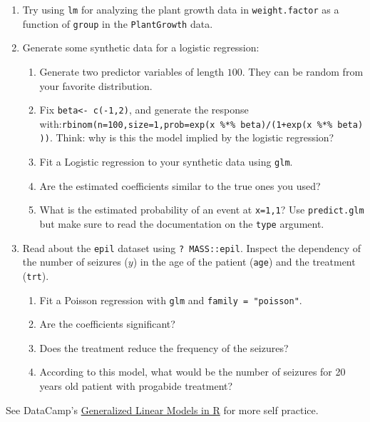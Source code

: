 \documentclass[]{book}
\providecommand{\tightlist}{%
  \setlength{\itemsep}{0pt}\setlength{\parskip}{0pt}}
\theoremstyle{definition}
\theoremstyle{definition}
\theoremstyle{definition}
\theoremstyle{remark}
\begin{document}
\begin{enumerate}
\def\labelenumi{\arabic{enumi}.}
\item
  Try using \texttt{lm} for analyzing the plant growth data in
  \texttt{weight.factor} as a function of \texttt{group} in the
  \texttt{PlantGrowth} data.
\item
  Generate some synthetic data for a logistic regression:

  \begin{enumerate}
  \def\labelenumii{\alph{enumii}.}
  \tightlist
  \item
    Generate two predictor variables of length \(100\). They can be
    random from your favorite distribution.
  \item
    Fix \texttt{beta\textless{}-\ c(-1,2)}, and generate the response
    with:\texttt{rbinom(n=100,size=1,prob=exp(x\ \%*\%\ beta)/(1+exp(x\ \%*\%\ beta)))}.
    Think: why is this the model implied by the logistic regression?
  \item
    Fit a Logistic regression to your synthetic data using \texttt{glm}.
  \item
    Are the estimated coefficients similar to the true ones you used?
  \item
    What is the estimated probability of an event at \texttt{x=1,1}? Use
    \texttt{predict.glm} but make sure to read the documentation on the
    \texttt{type} argument.
  \end{enumerate}
\item
  Read about the \texttt{epil} dataset using \texttt{?\ MASS::epil}.
  Inspect the dependency of the number of seizures (\(y\)) in the age of
  the patient (\texttt{age}) and the treatment (\texttt{trt}).

  \begin{enumerate}
  \def\labelenumii{\arabic{enumii}.}
  \tightlist
  \item
    Fit a Poisson regression with \texttt{glm} and
    \texttt{family\ =\ "poisson"}.
  \item
    Are the coefficients significant?\\
  \item
    Does the treatment reduce the frequency of the seizures?
  \item
    According to this model, what would be the number of seizures for 20
    years old patient with progabide treatment?
  \end{enumerate}
\end{enumerate}

See DataCamp's
\href{https://www.datacamp.com/courses/generalized-linear-models-in-r}{Generalized
Linear Models in R} for more self practice.
\end{document}

